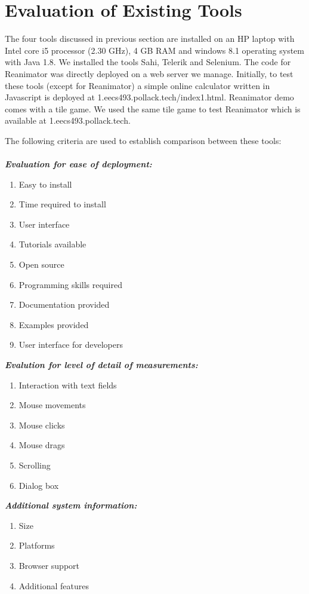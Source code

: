 \documentclass[12pt,journal]{IEEEtran}
\begin{document}
\section{Evaluation of Existing Tools}
 The four tools discussed in previous section are installed on an HP laptop with Intel core i5 processor (2.30 GHz), 4 GB RAM and windows 8.1 operating system with Java 1.8. We installed the tools Sahi, Telerik and Selenium. The code for Reanimator was directly deployed on a web server we manage. Initially, to test these tools (except for Reanimator) a simple online calculator written in Javascript is deployed at 1.eecs493.pollack.tech/index1.html. Reanimator demo comes with a tile game. We used the same tile game to test Reanimator which is available at 1.eecs493.pollack.tech.
\par
The following criteria are used to establish comparison between these tools:\\ \\
\textbf{ \textit{Evaluation for ease of deployment:}}
\begin{enumerate}
\item Easy to install
\item Time required to install
\item User interface
\item Tutorials available
\item Open source
\item Programming skills required
\item Documentation provided
\item Examples provided
\item User interface for developers\\
\end{enumerate}
\textbf{\textit{Evalution for level of detail of measurements:}}
\begin{enumerate}
\item Interaction with text fields
\item Mouse movements
\item Mouse clicks
\item Mouse drags
\item Scrolling
\item Dialog box\\
\end{enumerate}
\textbf{\textit{Additional system information:}}
\begin{enumerate}
\item Size
\item Platforms
\item Browser support
\item Additional features\\
\end{enumerate}
\end{document}
